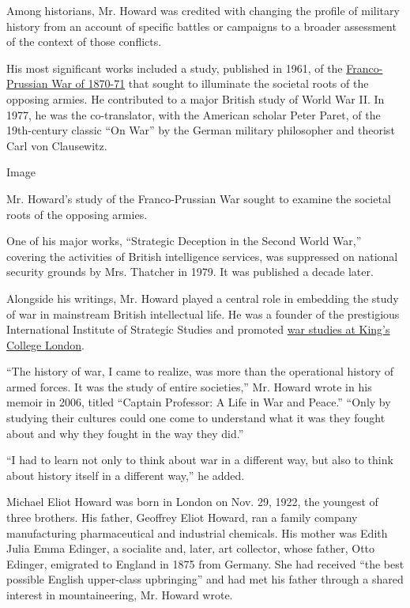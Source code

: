 Among historians, Mr. Howard was credited with changing the profile of
military history from an account of specific battles or campaigns to a
broader assessment of the context of those conflicts.

His most significant works included a study, published in 1961, of the
\href{https://www.goodreads.com/book/show/25863.The_Franco_Prussian_War}{Franco-Prussian
War of 1870-71} that sought to illuminate the societal roots of the
opposing armies. He contributed to a major British study of World War
II. In 1977, he was the co-translator, with the American scholar Peter
Paret, of the 19th-century classic ``On War'' by the German military
philosopher and theorist Carl von Clausewitz.

Image

Mr. Howard's study of the Franco-Prussian War sought to examine the
societal roots of the opposing armies.

One of his major works, ``Strategic Deception in the Second World War,''
covering the activities of British intelligence services, was suppressed
on national security grounds by Mrs. Thatcher in 1979. It was published
a decade later.

Alongside his writings, Mr. Howard played a central role in embedding
the study of war in mainstream British intellectual life. He was a
founder of the prestigious International Institute of Strategic Studies
and promoted
\href{https://www.kcl.ac.uk/sspp/departments/warstudies/index.aspx}{war
studies at King's College London}.

``The history of war, I came to realize, was more than the operational
history of armed forces. It was the study of entire societies,'' Mr.
Howard wrote in his memoir in 2006, titled ``Captain Professor: A Life
in War and Peace.'' ``Only by studying their cultures could one come to
understand what it was they fought about and why they fought in the way
they did.''

``I had to learn not only to think about war in a different way, but
also to think about history itself in a different way,'' he added.

Michael Eliot Howard was born in London on Nov. 29, 1922, the youngest
of three brothers. His father, Geoffrey Eliot Howard, ran a family
company manufacturing pharmaceutical and industrial chemicals. His
mother was Edith Julia Emma Edinger, a socialite and, later, art
collector, whose father, Otto Edinger, emigrated to England in 1875 from
Germany. She had received ``the best possible English upper-class
upbringing'' and had met his father through a shared interest in
mountaineering, Mr. Howard wrote.


